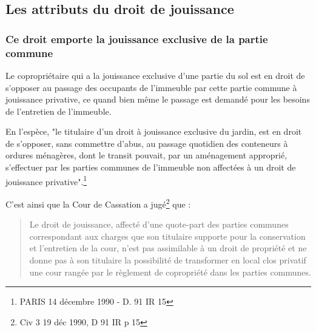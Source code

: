 	\subsection{Les attributs du droit de jouissance}
	
		\subsubsection{Ce droit emporte la jouissance exclusive de la partie commune}
		
			Le copropriétaire qui a la jouissance exclusive d'une partie du sol est en droit de s'opposer au passage des
			occupants de l'immeuble par cette partie commune à jouissance privative, ce quand bien même le passage
			est demandé pour les besoins de l'entretien de l'immeuble.
			
			En l'espèce, "le titulaire d'un droit à jouissance exclusive du jardin, est en droit de s'opposer, sans
			commettre d'abus, au passage quotidien des conteneurs à ordures ménagères, dont le transit
			pouvait, par un aménagement approprié, s'effectuer par les parties communes de l'immeuble non
			affectées à un droit de jouissance privative".\footnote{PARIS 14 décembre 1990 - D. 91 IR 15}
			
			C’est ainsi que la Cour de Cassation a jugé\footnote{Civ 3 19 déc 1990, D 91 IR p 15} que : 
			\begin{quote}
				Le droit de jouissance, affecté d'une quote-part
				des parties communes correspondant aux charges que son titulaire supporte pour la conservation
				et l'entretien de la cour, n'est pas assimilable à un droit de propriété et ne donne pas à son titulaire
				la possibilité de transformer en local clos privatif une cour rangée par le règlement de copropriété
				dans les parties communes.
			\end{quote}
		
